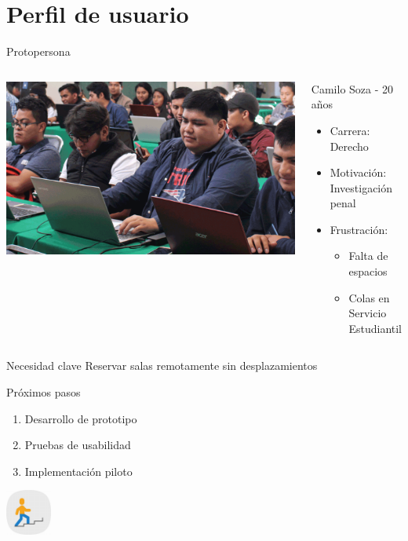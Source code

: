 \documentclass[10pt]{beamer}
\begin{document}
\section{Perfil de usuario}
\begin{frame}{Protopersona}
\begin{columns}
\includegraphics[width=\textwidth]{assets/est.png} %

\begin{exampleblock}{Camilo Soza - 20 años}
\begin{itemize}
\item Carrera: Derecho
\item Motivación: Investigación penal
\item Frustración: 
\begin{itemize}
\item Falta de espacios
\item Colas en Servicio Estudiantil
\end{itemize}
\end{itemize}
\end{exampleblock}
\end{columns}

\begin{alertblock}{Necesidad clave}
Reservar salas remotamente sin desplazamientos
\end{alertblock}
\end{frame}

\begin{frame}{Próximos pasos}
\centering
\Large
\begin{enumerate}
\item Desarrollo de prototipo
\item Pruebas de usabilidad
\item Implementación piloto
\end{enumerate}

\vspace{1cm}
\includegraphics[height=1.5cm]{assets/next.jpeg} %
\end{frame}
\end{document}
